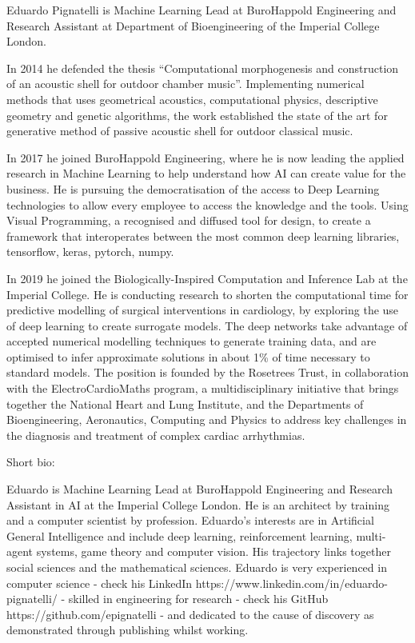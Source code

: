 Eduardo Pignatelli is Machine Learning Lead at BuroHappold Engineering and Research Assistant at Department of Bioengineering of the Imperial College London.

In 2014 he defended the thesis “Computational morphogenesis and construction of an acoustic shell for outdoor chamber music”. Implementing numerical methods that uses geometrical acoustics, computational physics, descriptive geometry and genetic algorithms, the work established the state of the art for generative method of passive acoustic shell for outdoor classical music.

In 2017 he joined BuroHappold Engineering, where he is now leading the applied research in Machine Learning to help understand how AI can create value for the business. He is pursuing the democratisation of the access to Deep Learning technologies to allow every employee to access the knowledge and the tools. Using Visual Programming, a recognised and diffused tool for design, to create a framework that interoperates between the most common deep learning libraries, tensorflow, keras, pytorch, numpy.

In 2019 he joined the Biologically-Inspired Computation and Inference Lab at the Imperial College. He is conducting research to shorten the computational time for predictive modelling of surgical interventions in cardiology, by exploring the use of deep learning to create surrogate models. The deep networks take advantage of accepted numerical modelling techniques to generate training data, and are optimised to infer approximate solutions in about 1\% of time necessary to standard models. The position is founded by the Rosetrees Trust, in collaboration with the ElectroCardioMaths program, a multidisciplinary initiative that brings together the National Heart and Lung Institute, and the Departments of Bioengineering, Aeronautics, Computing and Physics to address key challenges in the diagnosis and treatment of complex cardiac arrhythmias.


Short bio:

Eduardo is Machine Learning Lead at BuroHappold Engineering and Research Assistant in AI at the Imperial College London. He is an architect by training and a computer scientist by profession. Eduardo's interests are in Artificial General Intelligence and include deep learning, reinforcement learning, multi-agent systems, game theory and computer vision. His trajectory links together social sciences and the mathematical sciences. Eduardo is very experienced in computer science - check his LinkedIn https://www.linkedin.com/in/eduardo-pignatelli/ - skilled in engineering for research - check his GitHub https://github.com/epignatelli - and dedicated to the cause of discovery as demonstrated through publishing whilst working.



